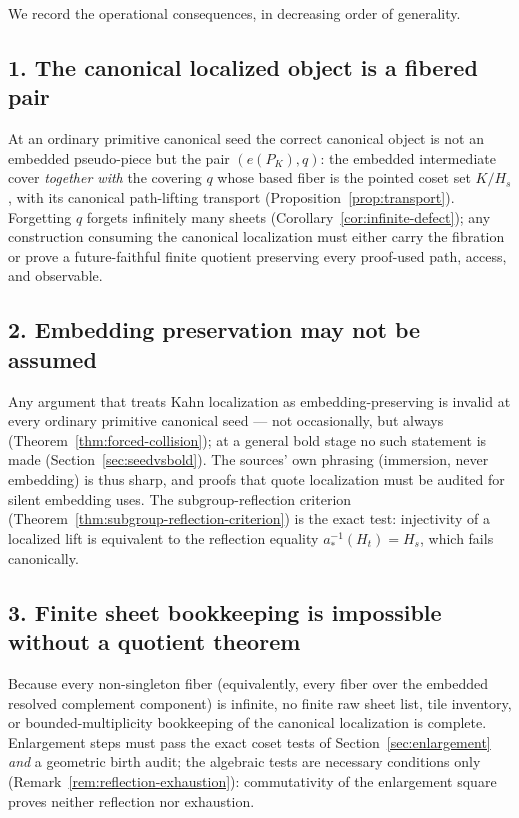 \documentclass[11pt,reqno]{amsart}
\theoremstyle{definition}
\theoremstyle{remark}
\begin{document}
We record the operational consequences, in decreasing order of
generality.

\subsection*{1. The canonical localized object is a fibered pair}
At an ordinary primitive canonical seed the correct canonical object is
not an embedded pseudo-piece but the pair $(e(P_{K}),q)$: the embedded
intermediate cover \emph{together with} the covering $q$ whose based
fiber is the pointed coset set $K/H_{s}$, with its canonical
path-lifting transport (Proposition~\ref{prop:transport}).  Forgetting
$q$ forgets infinitely many sheets
(Corollary~\ref{cor:infinite-defect}); any construction consuming the
canonical localization must either carry the fibration or prove a
future-faithful finite quotient preserving every proof-used path,
access, and observable.

\subsection*{2. Embedding preservation may not be assumed}
Any argument that treats Kahn localization as embedding-preserving is
invalid at every ordinary primitive canonical seed --- not occasionally,
but always (Theorem~\ref{thm:forced-collision}); at a general bold
stage no such statement is made
(Section~\ref{sec:seedvsbold}).  The sources' own
phrasing (immersion, never embedding) is thus sharp, and proofs that
quote localization must be audited for silent embedding uses.  The
subgroup-reflection criterion (Theorem~\ref{thm:subgroup-reflection-criterion})
is the exact test: injectivity of a localized lift is equivalent to the
reflection equality $a_{*}^{-1}(H_{t})=H_{s}$, which fails canonically.

\subsection*{3. Finite sheet bookkeeping is impossible without a quotient theorem}
Because every non-singleton fiber (equivalently, every fiber over the
embedded resolved complement component) is infinite, no finite raw
sheet list,
tile inventory, or bounded-multiplicity bookkeeping of the canonical
localization is complete.  Enlargement steps must pass the exact coset
tests of Section~\ref{sec:enlargement} \emph{and} a geometric
birth audit; the algebraic tests are necessary conditions only
(Remark~\ref{rem:reflection-exhaustion}): commutativity of the
enlargement square proves neither reflection nor exhaustion.
\end{document}
